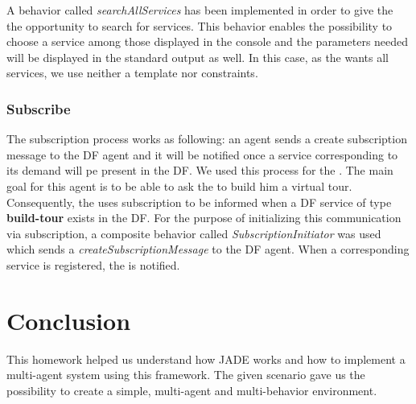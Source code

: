 \documentclass[a4paper,11pt]{article}
\begin{document}
  A behavior called \textit{searchAllServices} has been implemented in order to give the \pa{} the opportunity to search for services. This behavior
  enables the possibility to choose a service among those displayed in the console and the parameters needed will be displayed in the standard output as well.
  In this case, as the \pa{} wants all services, we use neither a template nor constraints.
  
  \subsubsection{Subscribe}
  The subscription process works as following: an agent sends a create subscription message to the DF agent and it will be notified once a
  service corresponding to its demand will pe present in the DF. We used this process for the \pa{}. The main goal for this agent is to be
  able to ask the \to{} to build him a virtual tour. Consequently, the \pa{} uses subscription to be informed when a DF service of type
  \textbf{build-tour} exists in the DF. For the purpose of initializing this communication via subscription, a composite behavior called
  \textit{SubscriptionInitiator} was used which sends a \textit{createSubscriptionMessage} to the DF agent. When a corresponding service is
  registered, the \pa{} is notified.
  
  \section{Conclusion}
  
  This homework helped us understand how JADE works and how to implement a multi-agent system using this framework. The given 
  scenario gave us the possibility to create a simple, multi-agent and multi-behavior environment.
  
\end{document}
